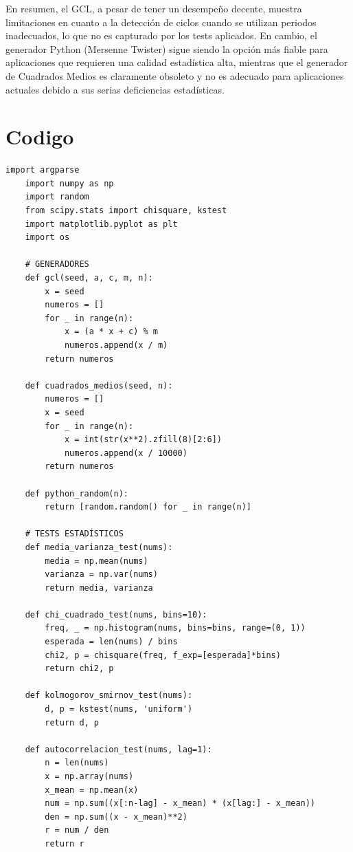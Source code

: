 \documentclass{article}
\begin{document}
En resumen, el GCL, a pesar de tener un desempeño decente, muestra limitaciones en cuanto a la detección de ciclos cuando se utilizan periodos inadecuados, lo que no es capturado por los tests aplicados. En cambio, el generador Python (Mersenne Twister) sigue siendo la opción más fiable para aplicaciones que requieren una calidad estadística alta, mientras que el generador de Cuadrados Medios es claramente obsoleto y no es adecuado para aplicaciones actuales debido a sus serias deficiencias estadísticas.

\section{Codigo}
    \begin{Verbatim}[fontsize=\scriptsize]
    import argparse
    import numpy as np
    import random
    from scipy.stats import chisquare, kstest
    import matplotlib.pyplot as plt
    import os
    
    # GENERADORES
    def gcl(seed, a, c, m, n):
        x = seed
        numeros = []
        for _ in range(n):
            x = (a * x + c) % m
            numeros.append(x / m)
        return numeros
    
    def cuadrados_medios(seed, n):
        numeros = []
        x = seed
        for _ in range(n):
            x = int(str(x**2).zfill(8)[2:6])
            numeros.append(x / 10000)
        return numeros
    
    def python_random(n):
        return [random.random() for _ in range(n)]
    
    # TESTS ESTADÍSTICOS
    def media_varianza_test(nums):
        media = np.mean(nums)
        varianza = np.var(nums)
        return media, varianza
    
    def chi_cuadrado_test(nums, bins=10):
        freq, _ = np.histogram(nums, bins=bins, range=(0, 1))
        esperada = len(nums) / bins
        chi2, p = chisquare(freq, f_exp=[esperada]*bins)
        return chi2, p
    
    def kolmogorov_smirnov_test(nums):
        d, p = kstest(nums, 'uniform')
        return d, p
    
    def autocorrelacion_test(nums, lag=1):
        n = len(nums)
        x = np.array(nums)
        x_mean = np.mean(x)
        num = np.sum((x[:n-lag] - x_mean) * (x[lag:] - x_mean))
        den = np.sum((x - x_mean)**2)
        r = num / den
        return r
    

\end{Verbatim}
\end{document}
